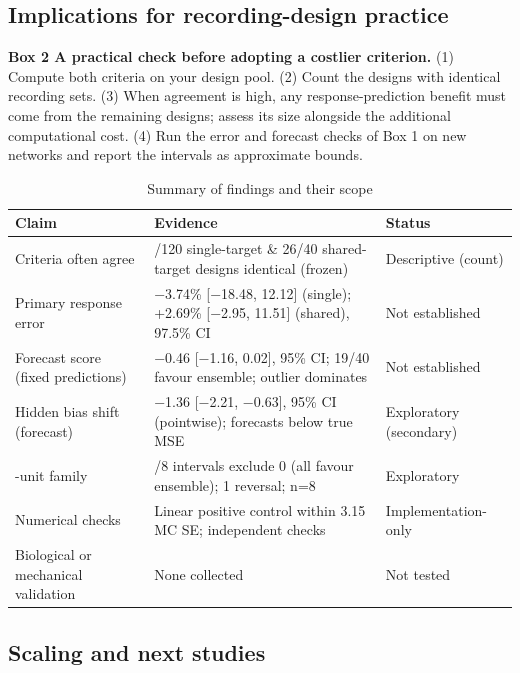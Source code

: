 \subsection{Implications for recording-design practice}

\textbf{Box 2 \textbar{} A practical check before adopting a costlier criterion.} (1) Compute both criteria on your design pool. (2) Count the designs with identical recording sets. (3) When agreement is high, any response-prediction benefit must come from the remaining designs; assess its size alongside the additional computational cost. (4) Run the error and forecast checks of Box 1 on new networks and report the intervals as approximate bounds.

\begin{table}[!tbp]
\setcounter{table}{1}
\caption{Summary of findings and their scope}
\label{tab:2}
\centering\small
\setlength{\tblw}{\dimexpr\textwidth-6\tabcolsep\relax}
\begin{tabular}{>{\raggedright\arraybackslash}p{0.2932\tblw}>{\raggedright\arraybackslash}p{0.5029\tblw}>{\raggedright\arraybackslash}p{0.2039\tblw}}
\toprule
Claim & Evidence & Status \\
\midrule
Criteria often agree & 82/120 single-target \& 26/40 shared-target designs identical (frozen) & Descriptive (count) \\
Primary response error & −3.74\% {[}−18.48, 12.12{]} (single); +2.69\% {[}−2.95, 11.51{]} (shared), 97.5\% CI & Not established \\
Forecast score (fixed predictions) & −0.46 {[}−1.16, 0.02{]}, 95\% CI; 19/40 favour ensemble; outlier dominates & Not established \\
Hidden bias shift (forecast) & −1.36 {[}−2.21, −0.63{]}, 95\% CI (pointwise); forecasts below true MSE & Exploratory (secondary) \\
100-unit family & 4/8 intervals exclude 0 (all favour ensemble); 1 reversal; n=8 & Exploratory \\
Numerical checks & Linear positive control within 3.15 MC SE; independent checks & Implementation-only \\
Biological or mechanical validation & None collected & Not tested \\
\bottomrule
\end{tabular}
\end{table}

\subsection{Scaling and next studies}

